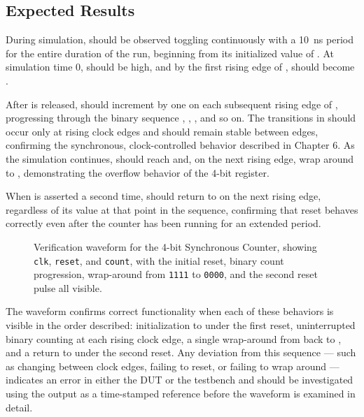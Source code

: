 \subsection{Expected Results}

During simulation,  should be observed toggling continuously with a 10~ns period for the entire duration of the run, beginning from its initialized value of . At simulation time 0,  should be high, and by the first rising edge of ,  should become .

After  is released,  should increment by one on each subsequent rising edge of , progressing through the binary sequence , , , and so on. The transitions in  should occur only at rising clock edges and should remain stable between edges, confirming the synchronous, clock-controlled behavior described in Chapter 6. As the simulation continues,  should reach  and, on the next rising edge, wrap around to , demonstrating the overflow behavior of the 4-bit register.

When  is asserted a second time,  should return to  on the next rising edge, regardless of its value at that point in the sequence, confirming that reset behaves correctly even after the counter has been running for an extended period.


\begin{figure}[h]
\centering
\caption{Verification waveform for the 4-bit Synchronous Counter, showing \texttt{clk}, \texttt{reset}, and \texttt{count}, with the initial reset, binary count progression, wrap-around from \texttt{1111} to \texttt{0000}, and the second reset pulse all visible.}
\label{fig:counter_tb_waveform}
\end{figure}

The waveform confirms correct functionality when each of these behaviors is visible in the order described: initialization to  under the first reset, uninterrupted binary counting at each rising clock edge, a single wrap-around from  back to , and a return to  under the second reset. Any deviation from this sequence --- such as  changing between clock edges, failing to reset, or failing to wrap around --- indicates an error in either the DUT or the testbench and should be investigated using the  output as a time-stamped reference before the waveform is examined in detail.

